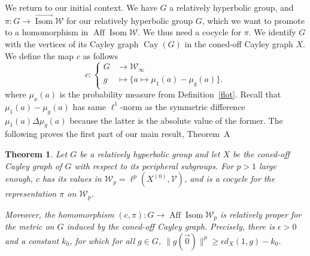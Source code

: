 \documentclass[11pt]{article}
\newtheorem{theo}{Theorem}[section]
\theoremstyle{definition}
\numberwithin{equation}{section}
\DeclareMathOperator{\Isom}{Isom}
\DeclareMathOperator{\Aff}{Aff}
\DeclareMathOperator{\Cay}{Cay}
\begin{document}
We return to our initial context. We have $G$ a relatively hyperbolic group, and $\pi: G\to \overrightarrow{{\Isom}} {\mathscr{W}} $ for our relatively hyperbolic group $G$, which we want to promote to a homomorphism in ${\Aff}{\Isom} {\mathscr{W}} $. We thus need a cocycle for $\pi$. We identify $G$ with the vertices of its Cayley graph $\Cay (G)$ in the coned-off Cayley graph $X$. We define the map $c$ as follows
\[
c: \left\{
\begin{aligned} G &\to \mathscr{W}_{\infty}
\\ g & \mapsto \{a \mapsto
\mu_1(a) -
\mu_g(a)
\}.
\end{aligned} \right.
\]
where $\mu_x(a)$ is the probability measure from Definition~\ref{flot}. Recall that $\mu_1(a) - \mu_g(a)$ has same $\ell^1$-norm as the symmetric difference $\mu_1(a) \Delta\mu_{g}(a)$ because the latter is the absolute value of the former. The following proves the first part of our main result, Theorem~A

\begin{theo}\label{thm;actionAL}
Let $G$ be a relatively hyperbolic group and let $X$ be the coned-off Cayley graph of $G$ with respect to its peripheral subgroups. For $p>1$ large enough, $c$ has its values in $\mathscr{W}_p=\ell^p(X^{(0)},\mathscr{V})$, and is a cocycle for the representation $\pi$ on $\mathscr{W}_p$.

Moreover, the homomorphism $(c,\pi): G \to {\Aff}{\Isom} {\mathscr{W}}_p$ is relatively proper for the metric on $G$ induced by the coned-off Cayley graph. Precisely, there is $\epsilon >0$ and a constant $k_0$, for which for all $g\in G$, $\|g(\vec{0})\|^p
\geq \epsilon d_X(1,g) -k_0$.
\end{theo}
\end{document}
